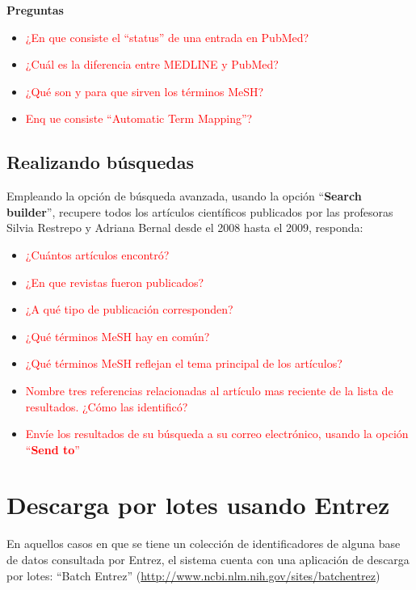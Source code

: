 \documentclass[letter,11pt]{book}
\begin{document}
\textbf{Preguntas}

\begin{itemize}
\item \textcolor{red}{¿En que consiste el ``status'' de una entrada en PubMed?}
\item \textcolor{red}{¿Cuál es la diferencia entre MEDLINE y PubMed?}
\item \textcolor{red}{¿Qué son y para que sirven los términos MeSH?}
\item \textcolor{red}{Enq ue consiste ``Automatic Term Mapping''?}
\end{itemize}

\subsection{Realizando búsquedas}

Empleando la opción de búsqueda avanzada, usando la opción ``\textbf{Search builder}'', recupere todos los artículos científicos publicados por las profesoras Silvia Restrepo y Adriana Bernal desde el 2008 hasta el 2009, responda:

 \begin{itemize}
\item  \textcolor{red}{¿Cuántos artículos encontró?}
\item  \textcolor{red}{¿En que revistas fueron publicados?}
\item \textcolor{red}{¿A qué tipo de publicación corresponden?}
\item \textcolor{red}{¿Qué términos MeSH hay en común?}
\item \textcolor{red}{¿Qué términos MeSH reflejan el tema principal de los artículos?}
\item \textcolor{red}{Nombre tres referencias relacionadas al artículo mas reciente de la lista de resultados. ¿Cómo las identificó?}
\item \textcolor{red}{Envíe los resultados de su búsqueda a su correo electrónico, usando la opción ``\textbf{Send to}''}
\end{itemize}

\section{Descarga por lotes usando Entrez}

En aquellos casos en que se tiene un colección de identificadores de alguna base de datos consultada por Entrez, el sistema cuenta con una aplicación de descarga por lotes: ``Batch Entrez'' (\url{http://www.ncbi.nlm.nih.gov/sites/batchentrez})
\end{document}
